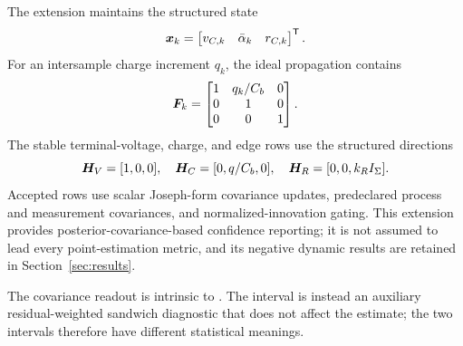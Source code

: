 The extension maintains the structured state
\begin{equation}
\bm{x}_k=\begin{bmatrix}v_{C,k}&\bar{\alpha}_k&r_{C,k}\end{bmatrix}^{\mathsf T}.
\label{eq:kf_state}
\end{equation}
For an intersample charge increment $q_k$, the ideal propagation contains
\begin{equation}
\bm{F}_k=
\begin{bmatrix}
1&q_k/C_b&0\\0&1&0\\0&0&1
\end{bmatrix}.
\label{eq:kf_transition}
\end{equation}
The stable terminal-voltage, charge, and edge rows use the structured directions
\begin{equation}
\bm{H}_V=[1,0,0],\quad
\bm{H}_C=[0,q/C_b,0],\quad
\bm{H}_R=[0,0,k_RI_\Sigma].
\label{eq:kf_directions}
\end{equation}
Accepted rows use scalar Joseph-form covariance updates, predeclared process and measurement covariances, and normalized-innovation gating. This extension provides posterior-covariance-based confidence reporting; it is not assumed to lead every point-estimation metric, and its negative dynamic results are retained in Section~\ref{sec:results}.

The covariance readout is intrinsic to \TSKF{}. The \TSRLS{} interval is instead an auxiliary residual-weighted sandwich diagnostic that does not affect the estimate; the two intervals therefore have different statistical meanings.
